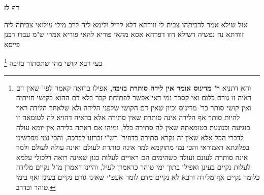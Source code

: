 \documentclass[12pt, openany]{book}
\newcommand{\sethebfont}{
\fontsize{10.5pt}{21.0pt} \selectfont
}
\newcommand{\twocol}[1]{
	{\sethebfont \begin{multicols}{2}
			#1
	\end{multicols}}	
}
\newcommand{\sectname}{}
\newcommand{\newsection}[1]{
	\addcontentsline{toc}{section}{#1}
	\renewcommand{\sectname}{#1}	
	\vspace{-\baselineskip}
	\begin{center}
		\textbf{%
\fontsize{16pt}{16pt}\selectfont
			#1}
	\end{center}
	\vspace{-\baselineskip}
	\nopagebreak
}
\newcommand{\footnotecomment}[1]{
	\renewcommand\thefootnote{}
	\footnote{#1}}
\newcommand{\commenta}[1]{\footnotecomment{#1}}
\begin{document}
\newsection{דף לז}
\twocol{אזל שילא אמר לדביתהו צבית לי זוודתא דלא ליזיל ולימא ליה לרב מילי עילואי צביתה ליה זוודתא נח נפשיה דשילא חזו דפרחא אסא מהאי פוריא להאי פוריא אמרי ש"מ עבדו רבנן פייסא 
\commenta{והא דתניא \textbf{ר' מרינוס אומר אין לידה סותרת בזיבה,} אפילו ברואה קאמר לפי' שאין דם ראיה זו גורם כלום ואי קסבר נמי דאי אפשר לפתיחת קבר בלא דם ההוא בקושי חזיתיה ואין קושי סותר כר' מרינוס וכיון שאין דם הקושי שלפני הלידה ולא שלאחר הלידה ראוי להיות סותר אף הלידה אינה סותרת שאין סתירה אלא בראיה דהויא לה לטומאה זו כנגיעה וכנוגעת בטומאתה שאין לה סתירה כלל, ומיהו אם ראתה בלידה אין יומא עולה לדברי הכל אלא שאין זה נקרא סתירה כדפיר' רש"י זכרונו לברכה, והכי נמי מפרשינן בפלוגתא דאמוראי והכי נמי מתוקמא למר אינה סותרת לעולם ואינה עולה לעולם ולמר אינה סותרת לעונם ועולה כשהימים הם ראויים לעלות כגון שאינה רואה דלכולי עלמא לעלות נקיים בעינן ואפילו בתוך ימי טוהר כדאמרן לעיל, והיינו דאמרן מ"ל נקיים מלידה כלומר נקיים אף מלידה ורבא לא נקיים מדם לומר אעפ"י שאינו גורם נקיים בעינן ואף בימי טוהר וכדרב. }
בעי רבא קושי מהו שתסתור בזיבה 
}
\end{document}
